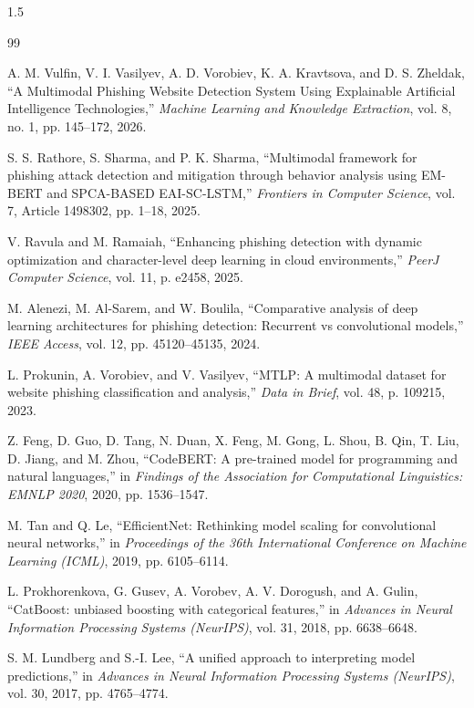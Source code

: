 \renewcommand{\bibname}{REFERENCES}
\cleardoublepage
{}
\begin{spacing}{1.5}
\begin{thebibliography}{99}

 A. M. Vulfin, V. I. Vasilyev, A. D. Vorobiev, K. A. Kravtsova, and D. S. Zheldak, ``A Multimodal Phishing Website Detection System Using Explainable Artificial Intelligence Technologies,'' \textit{Machine Learning and Knowledge Extraction}, vol. 8, no. 1, pp. 145--172, 2026.

 S. S. Rathore, S. Sharma, and P. K. Sharma, ``Multimodal framework for phishing attack detection and mitigation through behavior analysis using EM-BERT and SPCA-BASED EAI-SC-LSTM,'' \textit{Frontiers in Computer Science}, vol. 7, Article 1498302, pp. 1--18, 2025.

 V. Ravula and M. Ramaiah, ``Enhancing phishing detection with dynamic optimization and character-level deep learning in cloud environments,'' \textit{PeerJ Computer Science}, vol. 11, p. e2458, 2025.

 M. Alenezi, M. Al-Sarem, and W. Boulila, ``Comparative analysis of deep learning architectures for phishing detection: Recurrent vs convolutional models,'' \textit{IEEE Access}, vol. 12, pp. 45120--45135, 2024.

 L. Prokunin, A. Vorobiev, and V. Vasilyev, ``MTLP: A multimodal dataset for website phishing classification and analysis,'' \textit{Data in Brief}, vol. 48, p. 109215, 2023.

 Z. Feng, D. Guo, D. Tang, N. Duan, X. Feng, M. Gong, L. Shou, B. Qin, T. Liu, D. Jiang, and M. Zhou, ``CodeBERT: A pre-trained model for programming and natural languages,'' in \textit{Findings of the Association for Computational Linguistics: EMNLP 2020}, 2020, pp. 1536--1547.

 M. Tan and Q. Le, ``EfficientNet: Rethinking model scaling for convolutional neural networks,'' in \textit{Proceedings of the 36th International Conference on Machine Learning (ICML)}, 2019, pp. 6105--6114.

 L. Prokhorenkova, G. Gusev, A. Vorobev, A. V. Dorogush, and A. Gulin, ``CatBoost: unbiased boosting with categorical features,'' in \textit{Advances in Neural Information Processing Systems (NeurIPS)}, vol. 31, 2018, pp. 6638--6648.

 S. M. Lundberg and S.-I. Lee, ``A unified approach to interpreting model predictions,'' in \textit{Advances in Neural Information Processing Systems (NeurIPS)}, vol. 30, 2017, pp. 4765--4774.


\end{thebibliography}
\end{spacing}
